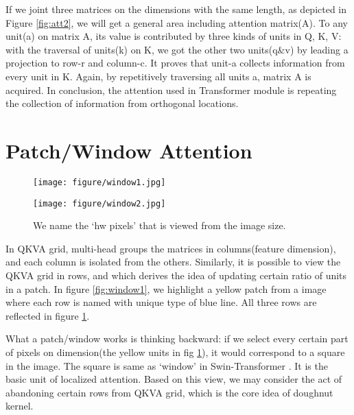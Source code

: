 \documentclass{article}
\theoremstyle{plain}
\theoremstyle{definition}
\theoremstyle{remark}
\begin{document}
If we joint three matrices on the dimensions with the same length, as depicted in Figure \ref{fig:att2}, we will get a general area including attention matrix(A). To any unit(a) on matrix A, its value is contributed by three kinds of units in Q, K, V: with the traversal of units(k) on K, we got the other two units(q\&v) by leading a projection to row-r and column-c. It proves that unit-a collects information from every unit in K. Again, by repetitively traversing all units a, matrix A is acquired. In conclusion, the attention used in Transformer module is repeating the collection of information from orthogonal locations.

\section{Patch/Window Attention}
\begin{figure}[h]
  \centering
  \begin{minipage}[t]{0.3\textwidth}
  \centering
  \texttt{[image: figure/window1.jpg]}
  \caption{}
  \label{fig:window1}
  \end{minipage}
  \begin{minipage}[t]{0.65\textwidth} 
  \centering  
  \texttt{[image: figure/window2.jpg]}
  \caption{We name the `hw pixels' that is viewed from the  image size.}
  \label{fig:window2}
  \end{minipage}   
\end{figure}
In QKVA grid, multi-head groups the matrices in columns(feature dimension), and each column is isolated from the others. Similarly, it is possible to view the QKVA grid in rows, and which derives the idea of updating certain ratio of units in a patch. In figure \ref{fig:window1}, we highlight a yellow patch from a image where each row is named with unique type of blue line. All three rows are reflected in figure \ref{fig:window2}.

What a patch/window works is thinking backward: if we select every certain part of pixels on  dimension(the yellow units in fig \ref{fig:window2}), it would correspond to a square in the image. The square is same as `window' in Swin-Transformer \cite{liu2021swin}. It is the basic unit of localized attention. Based on this view, we may consider the act of abandoning certain rows from QKVA grid, which is the core idea of doughnut kernel.
\end{document}
